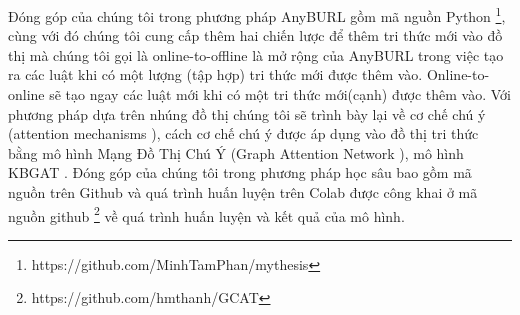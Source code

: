 Đóng góp của chúng tôi trong phương pháp AnyBURL\cite{burl} gồm mã nguồn Python \footnote{https://github.com/MinhTamPhan/mythesis}, cùng với đó chúng tôi cung cấp thêm hai chiến lược để thêm tri thức mới vào đồ thị mà chúng tôi gọi là online-to-offline là mở rộng của AnyBURL trong việc tạo ra các luật khi có một lượng (tập hợp) tri thức mới được thêm vào. Online-to-online sẽ tạo ngay các luật mới khi có một tri thức mới(cạnh) được thêm vào.
Với phương pháp dựa trên nhúng đồ thị chúng tôi sẽ trình bày lại về cơ chế chú ý (attention mechanisms \cite{vaswani2017attention}), cách cơ chế chú ý được áp dụng vào đồ thị tri thức bằng mô hình Mạng Đồ Thị Chú Ý (Graph Attention Network \cite{velivckovic2017graph}), mô hình KBGAT \cite{nathani2019learning}.
Đóng góp của chúng tôi trong phương pháp học sâu bao gồm mã nguồn trên Github  và quá trình huấn luyện trên Colab được công khai ở mã nguồn github \footnote{https://github.com/hmthanh/GCAT} về quá trình huấn luyện và kết quả của mô hình.






